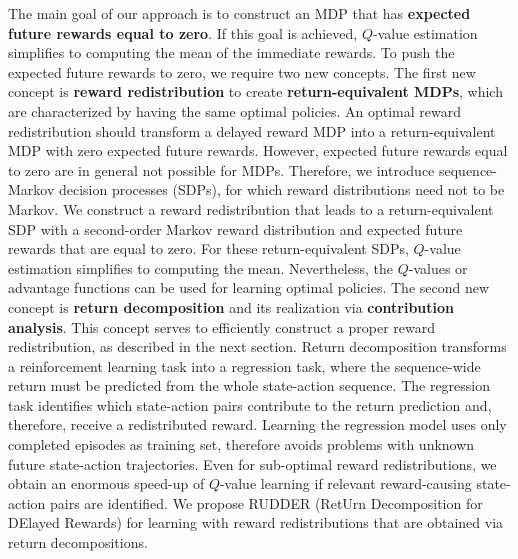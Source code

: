 \documentclass{article}
\begin{document}
The main goal of our approach is 
to construct an MDP that has {\bf expected future rewards equal to zero}. 
If this goal is achieved, 
$Q$-value estimation simplifies to computing the mean of the immediate rewards.
To push the expected future rewards to zero, we require two new concepts.
The first new concept is {\bf reward redistribution} to create {\bf return-equivalent MDPs}, 
which are characterized by having the same optimal policies. 
An optimal reward redistribution should transform a delayed reward MDP into  
a return-equivalent MDP with zero expected future rewards.
However, expected future rewards equal to zero are in general not possible for MDPs.
Therefore, we introduce sequence-Markov decision processes (SDPs),
for which reward distributions need not to be Markov.
We construct a reward redistribution that leads to a return-equivalent
SDP with a second-order Markov reward distribution and 
expected future rewards that are equal to zero.
For these return-equivalent 
SDPs, $Q$-value estimation simplifies to computing the mean. 
Nevertheless, the $Q$-values or advantage functions 
can be used for learning optimal policies.
The second new concept is
{\bf return decomposition} and its realization via {\bf contribution analysis}.
This concept serves to efficiently construct a proper reward redistribution,
as described in the next section.
Return decomposition transforms a reinforcement learning task 
into a regression task, where the sequence-wide 
return must be predicted from the whole state-action sequence.
The regression task identifies which state-action pairs
contribute to the return prediction and, therefore, receive a redistributed reward. 
Learning the regression model uses only completed episodes as training set,
therefore avoids problems with unknown future state-action trajectories.
Even for sub-optimal reward redistributions, we obtain an enormous speed-up
of $Q$-value learning if relevant reward-causing state-action pairs are identified.
We propose RUDDER (RetUrn Decomposition for DElayed Rewards) for learning with 
reward redistributions that are obtained via return decompositions.
\end{document}
